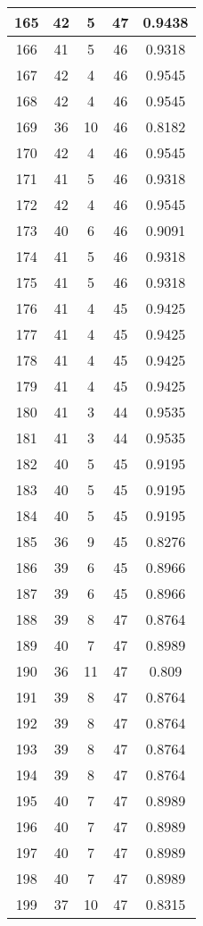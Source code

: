 \documentclass[letterpaper, 12pt]{article}
\begin{document}
\begin{longtable}{|c|c|c|c|c|}
\hline
165 & 42 & 5 & 47 & 0.9438 \\
\hline
166 & 41 & 5 & 46 & 0.9318 \\
\hline
167 & 42 & 4 & 46 & 0.9545 \\
\hline
168 & 42 & 4 & 46 & 0.9545 \\
\hline
169 & 36 & 10 & 46 & 0.8182 \\
\hline
170 & 42 & 4 & 46 & 0.9545 \\
\hline
171 & 41 & 5 & 46 & 0.9318 \\
\hline
172 & 42 & 4 & 46 & 0.9545 \\
\hline
173 & 40 & 6 & 46 & 0.9091 \\
\hline
174 & 41 & 5 & 46 & 0.9318 \\
\hline
175 & 41 & 5 & 46 & 0.9318 \\
\hline
176 & 41 & 4 & 45 & 0.9425 \\
\hline
177 & 41 & 4 & 45 & 0.9425 \\
\hline
178 & 41 & 4 & 45 & 0.9425 \\
\hline
179 & 41 & 4 & 45 & 0.9425 \\
\hline
180 & 41 & 3 & 44 & 0.9535 \\
\hline
181 & 41 & 3 & 44 & 0.9535 \\
\hline
182 & 40 & 5 & 45 & 0.9195 \\
\hline
183 & 40 & 5 & 45 & 0.9195 \\
\hline
184 & 40 & 5 & 45 & 0.9195 \\
\hline
185 & 36 & 9 & 45 & 0.8276 \\
\hline
186 & 39 & 6 & 45 & 0.8966 \\
\hline
187 & 39 & 6 & 45 & 0.8966 \\
\hline
188 & 39 & 8 & 47 & 0.8764 \\
\hline
189 & 40 & 7 & 47 & 0.8989 \\
\hline
190 & 36 & 11 & 47 & 0.809 \\
\hline
191 & 39 & 8 & 47 & 0.8764 \\
\hline
192 & 39 & 8 & 47 & 0.8764 \\
\hline
193 & 39 & 8 & 47 & 0.8764 \\
\hline
194 & 39 & 8 & 47 & 0.8764 \\
\hline
195 & 40 & 7 & 47 & 0.8989 \\
\hline
196 & 40 & 7 & 47 & 0.8989 \\
\hline
197 & 40 & 7 & 47 & 0.8989 \\
\hline
198 & 40 & 7 & 47 & 0.8989 \\
\hline
199 & 37 & 10 & 47 & 0.8315 \\
\hline
\end{longtable}
\end{document}
